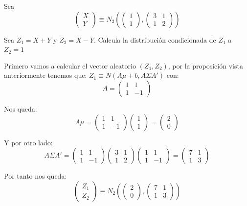 \documentclass[palatino,nochap]{apuntes}
\begin{document}
\begin{example}

Sea \[\left(
\begin{array}{c}
X \\
Y
\end{array}
\right) \equiv N_2 \left( \left(
\begin{array}{c}
1 \\
1
\end{array}
\right), \begin{pmatrix}3&1\\1&2\end{pmatrix} \right)\]

Sea $Z_1 = X+Y$ y $Z_2 = X-Y$. Calcula la  distribución condicionada de $Z_1$ a $Z_2=1$

Primero vamos a calcular el vector aleatorio $(Z_1,Z_2)$, por la proposición vista anteriormente tenemos que: $Z_1 \equiv N(A\mu+b,A\Sigma A')$ con:
\[
A=
\left(
\begin{array}{cc}
1 & 1 \\
1 & -1
\end{array}
\right)
\]

Nos queda:
\[
A\mu =
\left(
\begin{array}{cc}
1 & 1 \\
1 & -1
\end{array}
\right)
\left(
\begin{array}{c}
1 \\
1
\end{array}
\right)
=
\left(
\begin{array}{c}
2 \\
0
\end{array}
\right)
\]

Y por otro lado:
\[
A\Sigma A' =
\left(
\begin{array}{cc}
1 & 1 \\
1 & -1
\end{array}
\right)
\left(
\begin{array}{cc}
3& 1 \\
1& 2 
\end{array}
\right)
\left(
\begin{array}{cc}
1 & 1 \\
1 & -1
\end{array}
\right) =
\left(
\begin{array}{cc}
7 & 1 \\
1 & 3
\end{array}
\right)
\]

Por tanto nos queda:
\[\left(
\begin{array}{c}
Z_1 \\
Z_2
\end{array}
\right) \equiv N_2 \left( \left(
\begin{array}{c}
2 \\
0
\end{array}
\right), \begin{pmatrix}7&1\\1&3\end{pmatrix} \right)\]


\end{example}
\end{document}
